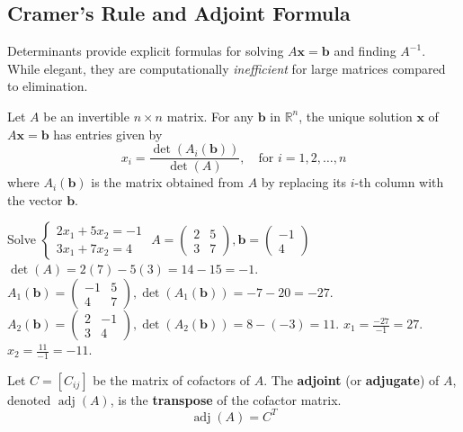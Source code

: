 \subsection{Cramer's Rule and Adjoint Formula}

Determinants provide explicit formulas for solving $A\mathbf{x} = \mathbf{b}$ and finding $A^{-1}$. While elegant, they are computationally \emph{inefficient} for large matrices compared to elimination.

\begin{theorem}
Let $A$ be an invertible $n \times n$ matrix. For any $\mathbf{b}$ in $\mathbb{R}^n$, the unique solution $\mathbf{x}$ of $A\mathbf{x} = \mathbf{b}$ has entries given by
\[ x_i = \frac{\det(A_i(\mathbf{b}))}{\det(A)}, \quad \text{for } i = 1, 2, \ldots, n \]
where $A_i(\mathbf{b})$ is the matrix obtained from $A$ by replacing its $i$-th column with the vector $\mathbf{b}$.
\end{theorem}

\begin{example}
Solve $ \begin{cases} 2x_1 + 5x_2 = -1 \\ 3x_1 + 7x_2 = 4 \end{cases} $
$A = \begin{pmatrix} 2 & 5 \\ 3 & 7 \end{pmatrix}, \mathbf{b} = \begin{pmatrix} -1 \\ 4 \end{pmatrix}$
$\det(A) = 2(7) - 5(3) = 14 - 15 = -1$.
$A_1(\mathbf{b}) = \begin{pmatrix} -1 & 5 \\ 4 & 7 \end{pmatrix}, \det(A_1(\mathbf{b})) = -7 - 20 = -27$.
$A_2(\mathbf{b}) = \begin{pmatrix} 2 & -1 \\ 3 & 4 \end{pmatrix}, \det(A_2(\mathbf{b})) = 8 - (-3) = 11$.
$x_1 = \frac{-27}{-1} = 27$.
$x_2 = \frac{11}{-1} = -11$.
\end{example}

\begin{definition}
Let $C = [C_{ij}]$ be the matrix of cofactors of $A$. The \textbf{adjoint} (or \textbf{adjugate}) of $A$, denoted $\operatorname{adj}(A)$, is the \textbf{transpose} of the cofactor matrix.
\[ \operatorname{adj}(A) = C^T \]
\end{definition}


